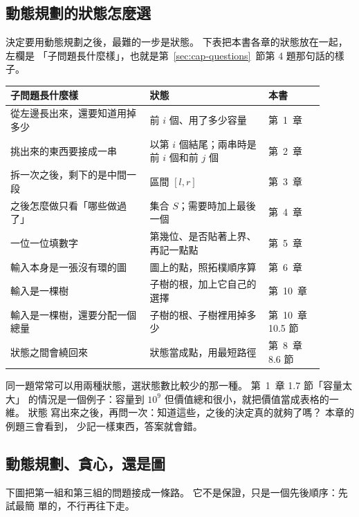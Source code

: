 \subsection{動態規劃的狀態怎麼選}
\label{sec:cap-state}

決定要用動態規劃之後，最難的一步是狀態。 下表把本書各章的狀態放在一起，左欄是
「子問題長什麼樣」，也就是第~\ref{sec:cap-questions}~節第 4 題那句話的樣子。

\begin{center}
\begin{tabular}{p{0.4\linewidth}p{0.34\linewidth}p{0.16\linewidth}}
\toprule
子問題長什麼樣 & 狀態 & 本書 \\
\midrule
從左邊長出來，還要知道用掉多少 & 前 $i$ 個、用了多少容量 & 第~1~章 \\
挑出來的東西要接成一串 & 以第 $i$ 個結尾；兩串時是前 $i$ 個和前 $j$ 個 & 第~2~章 \\
拆一次之後，剩下的是中間一段 & 區間 $[l, r]$ & 第~3~章 \\
之後怎麼做只看「哪些做過了」 & 集合 $S$；需要時加上最後一個 & 第~4~章 \\
一位一位填數字 & 第幾位、是否貼著上界、再記一點點 & 第~5~章 \\
輸入本身是一張沒有環的圖 & 圖上的點，照拓樸順序算 & 第~6~章 \\
輸入是一棵樹 & 子樹的根，加上它自己的選擇 & 第~10~章 \\
輸入是一棵樹，還要分配一個總量 & 子樹的根、子樹裡用掉多少 & 第~10~章 10.5 節 \\
狀態之間會繞回來 & 狀態當成點，用最短路徑 & 第~8~章 8.6 節 \\
\bottomrule
\end{tabular}
\end{center}

同一題常常可以用兩種狀態，選狀態數比較少的那一種。 第~1~章 1.7 節「容量太大」
的情況是一個例子：容量到 $10^9$ 但價值總和很小，就把價值當成表格的一維。 狀態
寫出來之後，再問一次：知道這些，之後的決定真的就夠了嗎？ 本章的例題三會看到，
少記一樣東西，答案就會錯。

\subsection{動態規劃、貪心，還是圖}
\label{sec:cap-decide}

下圖把第一組和第三組的問題接成一條路。 它不是保證，只是一個先後順序：先試最簡
單的，不行再往下走。

